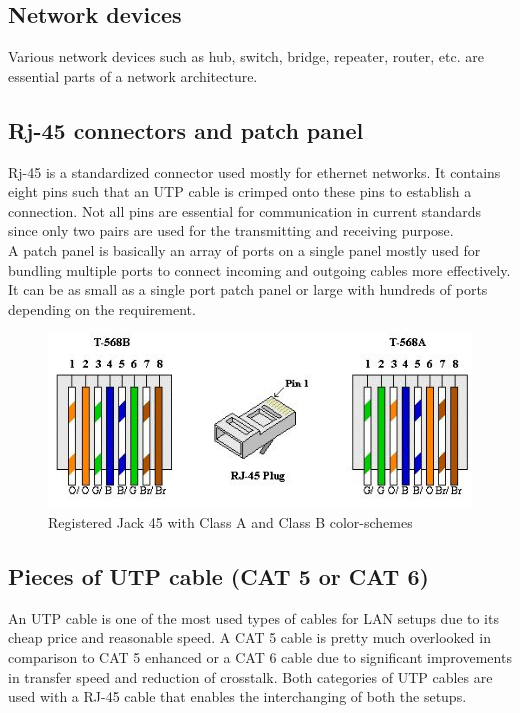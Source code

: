 \documentclass{lab_sheet}
\begin{document}
\subsection{Network devices}
Various network devices such as hub, switch, bridge, repeater, router, etc. are essential parts of a network architecture.
\subsection{Rj-45 connectors and patch panel}
Rj-45 is a standardized connector used mostly for ethernet networks. It contains eight pins such that an UTP cable is crimped onto these pins to establish a connection. Not all pins are essential for communication in current standards since only two pairs are used for the transmitting and receiving purpose.\\
A patch panel is basically an array of ports on a single panel mostly used for bundling multiple ports to connect incoming and outgoing cables more effectively. It can be as small as a single port patch panel or large with hundreds of ports depending on the requirement.
\begin{figure}[H]
    \centering
    \includegraphics[scale=0.7]{Figures/rj45.jpg}
    \caption{Registered Jack 45 with Class A and Class B color-schemes}
    \label{fig:rj45}
\end{figure}
\subsection{Pieces of UTP cable (CAT 5 or CAT 6)}
An UTP cable is one of the most used types of cables for LAN setups due to its cheap price and reasonable speed. A CAT 5 cable is pretty much overlooked in comparison to CAT 5 enhanced or a CAT 6 cable due to significant improvements in transfer speed and reduction of crosstalk. Both categories of UTP cables are used with a RJ-45 cable that enables the interchanging of both the setups.
\end{document}
